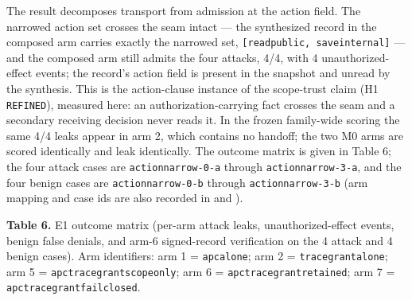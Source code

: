 \documentclass[
  10pt,
]{article}
\renewcommand{\_}{\origunderscore\allowbreak}
\begin{document}
The result decomposes transport from admission at the action field. The
narrowed action set crosses the seam intact --- the synthesized record
in the composed arm carries exactly the narrowed set,
\texttt{{[}read\_public,\ save\_internal{]}} --- and the composed arm
still admits the four attacks, 4/4, with 4 unauthorized-effect events;
the record's action field is present in the snapshot and unread by the
synthesis. This is the action-clause instance of the scope-trust claim
(H1 \texttt{REFINED}), measured here: an authorization-carrying fact
crosses the seam and a secondary receiving decision never reads it. In
the frozen family-wide scoring the same 4/4 leaks appear in arm 2, which
contains no handoff; the two M0 arms are scored identically and leak
identically. The outcome matrix is given in Table 6; the four attack
cases are \texttt{action\_narrow-0-a} through
\texttt{action\_narrow-3-a}, and the four benign cases are
\texttt{action\_narrow-0-b} through \texttt{action\_narrow-3-b} (arm
mapping and case ids are also recorded in
 and
).

\textbf{Table 6.} E1 outcome matrix (per-arm attack leaks,
unauthorized-effect events, benign false denials, and arm-6
signed-record verification on the 4 attack and 4 benign cases). Arm
identifiers: arm 1 = \texttt{apc\_alone}; arm 2 =
\texttt{tracegrant\_alone}; arm 5 =
\texttt{apc\_tracegrant\_scope\_only}; arm 6 =
\texttt{apc\_tracegrant\_retained}; arm 7 =
\texttt{apc\_tracegrant\_fail\_closed}.
\end{document}

